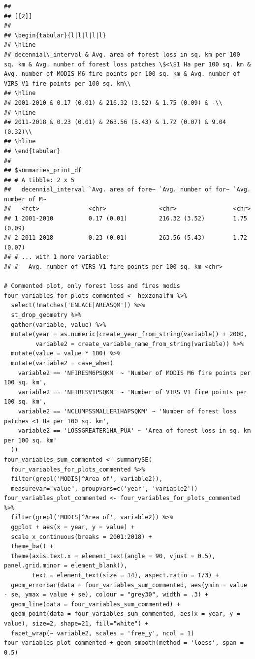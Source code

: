 \documentclass[10pt,landscape,a3paper]{article}
\begin{document}
\begin{verbatim}
## 
## [[2]]
## 
## \begin{tabular}{l|l|l|l|l}
## \hline
## decennial\_interval & Avg. area of forest loss in sq. km per 100 sq. km & Avg. number of forest loss patches \$<\$1 Ha per 100 sq. km & Avg. number of MODIS M6 fire points per 100 sq. km & Avg. number of VIRS V1 fire points per 100 sq. km\\
## \hline
## 2001-2010 & 0.17 (0.01) & 216.32 (3.52) & 1.75 (0.09) & -\\
## \hline
## 2011-2018 & 0.23 (0.01) & 263.56 (5.43) & 1.72 (0.07) & 9.04 (0.32)\\
## \hline
## \end{tabular}
## 
## $summaries_print_df
## # A tibble: 2 x 5
##   decennial_interval `Avg. area of fore~ `Avg. number of for~ `Avg. number of M~
##   <fct>              <chr>               <chr>                <chr>             
## 1 2001-2010          0.17 (0.01)         216.32 (3.52)        1.75 (0.09)       
## 2 2011-2018          0.23 (0.01)         263.56 (5.43)        1.72 (0.07)       
## # ... with 1 more variable:
## #   Avg. number of VIRS V1 fire points per 100 sq. km <chr>

# Commented plot, only forest loss and fires modis
four_variables_for_plots_commented <- hexzonalfm %>% 
  select(!matches('ENLACE|AREASQM')) %>%
  st_drop_geometry %>% 
  gather(variable, value) %>% 
  mutate(year = as.numeric(create_year_from_string(variable)) + 2000,
         variable2 = create_variable_name_from_string(variable)) %>% 
  mutate(value = value * 100) %>% 
  mutate(variable2 = case_when(
    variable2 == 'NFIRESM6PSQKM' ~ 'Number of MODIS M6 fire points per 100 sq. km',
    variable2 == 'NFIRESV1PSQKM' ~ 'Number of VIRS V1 fire points per 100 sq. km',
    variable2 == 'NCLUMPSSMALLER1HAPSQKM' ~ 'Number of forest loss patches <1 Ha per 100 sq. km',
    variable2 == 'LOSSGREATER1HA_PUA' ~ 'Area of forest loss in sq. km per 100 sq. km'
  ))
four_variables_sum_commented <- summarySE(
  four_variables_for_plots_commented %>%
  filter(grepl('MODIS|^Area of', variable2)),
  measurevar="value", groupvars=c('year', 'variable2'))
four_variables_plot_commented <- four_variables_for_plots_commented %>%
  filter(grepl('MODIS|^Area of', variable2)) %>% 
  ggplot + aes(x = year, y = value) +
  scale_x_continuous(breaks = 2001:2018) + 
  theme_bw() +
  theme(axis.text.x = element_text(angle = 90, vjust = 0.5), panel.grid.minor = element_blank(),
        text = element_text(size = 14), aspect.ratio = 1/3) +
  geom_errorbar(data = four_variables_sum_commented, aes(ymin = value - se, ymax = value + se), colour = "grey30", width = .3) +
  geom_line(data = four_variables_sum_commented) +
  geom_point(data = four_variables_sum_commented, aes(x = year, y = value), size=2, shape=21, fill="white") +
  facet_wrap(~ variable2, scales = 'free_y', ncol = 1)
four_variables_plot_commented + geom_smooth(method = 'loess', span = 0.5)
\end{verbatim}
\end{document}
